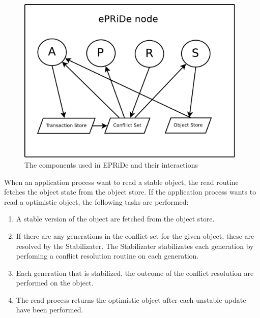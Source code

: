\begin{figure}[htb]
\centerline{\includegraphics[height=8cm]{components.pdf}}
\caption{The components used in EPRiDe and their interactions}\label{fig:components}
\end{figure}

When an application process want to read a stable object, the read routine fetches the object state from the object store. If the application process wants to read a optimistic object, the following tasks are performed: 
\begin{enumerate}
	\item A stable version of the object are fetched from the object store.
	\item If there are any generations in the conflict set for the given object, these are resolved by the Stabilizater. The Stabilizater stabilizates each generation by perfoming a conflict resolution routine on each generation. 
	\item Each generation that is stabilized, the outcome of the conflict resolution are performed on the object. 
	\item The read process returns the optimistic object after each unstable update have been performed.
\end{enumerate}




%


